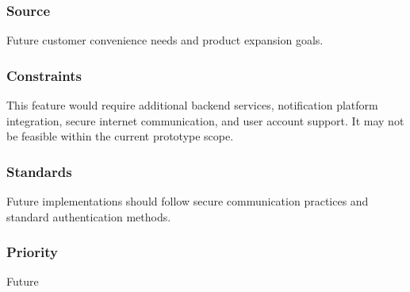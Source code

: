 \subsubsection{Source}
Future customer convenience needs and product expansion goals.

\subsubsection{Constraints}
This feature would require additional backend services, notification platform integration, secure internet communication, and user account support. It may not be feasible within the current prototype scope.

\subsubsection{Standards}
Future implementations should follow secure communication practices and standard authentication methods.

\subsubsection{Priority}
Future